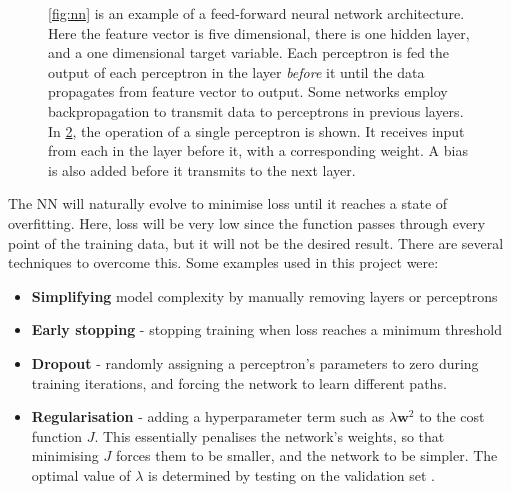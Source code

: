 \documentclass[12pt,a4paper]{article}
\begin{document}
\begin{figure}[h]
\begin{subfigure}[t]{0.3\linewidth}
    \caption{}\label{fig:perceptron}
    \end{subfigure}
\caption{\ref{fig:nn} is an example of a feed-forward neural network architecture. Here the feature vector is five dimensional, there is one hidden layer, and a one dimensional target variable. Each perceptron is fed the output of each perceptron in the layer \emph{before} it until the data propagates from feature vector to output. Some networks employ backpropagation to transmit data to perceptrons in previous layers. In \ref{fig:perceptron}, the operation of a single perceptron is shown. It receives input from each in the layer before it, with a corresponding weight. A bias is also added before it transmits to the next layer.}
\end{figure}
\pagebreak
The NN will naturally evolve to minimise loss until it reaches a state of overfitting. Here, loss will be very low since the function passes through every point of the training data, but it will not be the desired result. There are several techniques to overcome this. Some examples used in this project were:
\begin{itemize}
    \item \textbf{Simplifying} model complexity by manually removing layers or perceptrons
    \item \textbf{Early stopping} - stopping training when loss reaches a minimum threshold
    \item \textbf{Dropout} - randomly assigning a perceptron's parameters to zero during training iterations, and forcing the network to learn different paths.
    \item \textbf{Regularisation} - adding a hyperparameter term such as $\lambda \mathbf{w}^2$ to the cost function $J$. This essentially penalises the network's weights, so that minimising $J$ forces them to be smaller, and the network to be simpler. The optimal value of $\lambda$ is determined by testing on the validation set \cite{goodfellow_deep_2016}.
\end{itemize}
\end{document}
